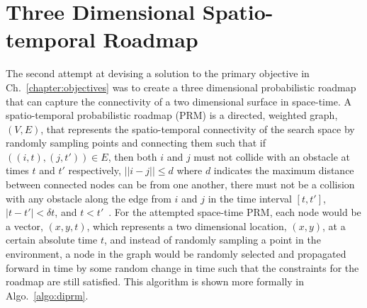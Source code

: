 \section{Three Dimensional Spatio-temporal Roadmap}

\label{sec:stroadmap}

The second attempt at devising a solution to the primary objective in
Ch.~\ref{chapter:objectives} was to create a three dimensional probabilistic
roadmap that can capture the connectivity of a two dimensional surface in
space-time. A spatio-temporal probabilistic roadmap (PRM) is a directed,
weighted graph, $(V, E)$, that represents the spatio-temporal connectivity of
the search space by randomly sampling points and connecting them such that if
$((i, t), (j, t')) \in E$, then both $i$ and $j$ must not collide with an
obstacle at times $t$ and $t'$ respectively, $||i - j|| \leq d$ where $d$
indicates the maximum distance between connected nodes can be from one another,
there must not be a collision with any obstacle along the edge from $i$ and $j$
in the time interval $[t, t']$, $|t - t'| < \delta t$, and $t < t'$~\cite{prm,
stprm}.  For the attempted space-time PRM, each node would be a vector, $(x, y,
t)$, which represents a two dimensional location, $(x, y)$, at a certain
absolute time $t$, and instead of randomly sampling a point in the environment,
a node in the graph would be randomly selected and propagated forward in time
by some random change in time such that the constraints for the roadmap are
still satisfied.  This algorithm is shown more formally in
Algo.~\ref{algo:diprm}.

